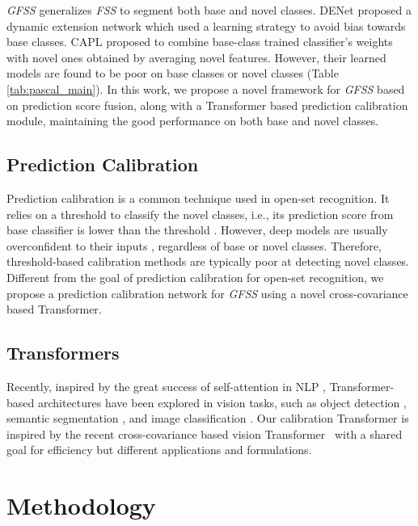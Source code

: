 \documentclass[journal]{IEEEtran}
\begin{document}
\textit{GFSS} \cite{liu2020dynamic} generalizes \textit{FSS} to segment both base and novel classes.
DENet \cite{liu2020dynamic} proposed a dynamic extension network which used a learning strategy to avoid bias towards base classes. 
CAPL \cite{tian2020generalized} proposed to combine base-class trained classifier's weights with novel ones obtained by averaging novel features.
However, their learned models are found to be poor on base classes \cite{liu2020dynamic} or novel classes \cite{tian2020generalized} (Table \ref{tab:pascal_main}). In this work, we propose a novel framework for \textit{GFSS} based on prediction score fusion, along with a Transformer based prediction calibration module, maintaining the good performance on both base and novel classes.

\subsection{Prediction Calibration}
Prediction calibration is a common technique used in open-set recognition. 
It relies on a threshold to classify the novel classes, i.e., its prediction score from base classifier is lower than the threshold \cite{hendrycks2016baseline}. 
However, deep models are usually overconfident to their inputs \cite{guo2017calibration,hein2019relu}, regardless of base or novel classes. Therefore, threshold-based calibration methods are typically poor at detecting novel classes. 
Different from the goal of prediction calibration for open-set recognition, we propose a prediction calibration network for \textit{GFSS} using a novel cross-covariance based Transformer.

\subsection{Transformers}
Recently, inspired by the great success of self-attention in NLP \cite{vaswani2017attention,devlin2019bert}, Transformer-based architectures have been explored in vision tasks, such as object detection \cite{hu2018relation,carion2020end}, semantic segmentation \cite{zheng2021rethinking}, and image classification \cite{dosovitskiy2020image,wu2020visual}. 
Our calibration Transformer is inspired by the recent  cross-covariance based vision Transformer~\cite{el2021xcit} with a shared goal for efficiency but different applications and formulations.

\section{Methodology}
\end{document}
